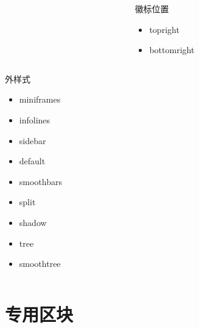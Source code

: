 \documentclass[
    aspectratio=169,  %
]{ctexbeamer}
\begin{document}
\begin{frame}
\begin{columns}[T]
\begin{column}{0.7\textwidth}
\begin{columns}[t]
\begin{column}{0.25\textwidth}
        \end{column}
        \begin{column}{0.3\textwidth}
          \begin{alertblock}{徽标位置}
            \ttfamily
            \begin{itemize}
              \item topright
              \item bottomright
            \end{itemize}
          \end{alertblock}
        \end{column}
      \end{columns}
      \begin{alertblock}{外样式}
        \ttfamily
        \begin{multicols}{3}
          \begin{itemize}
            \item miniframes
            \item infolines
            \item sidebar
            \item default
            \item smoothbars
            \item split
            \item shadow
            \item tree
            \item smoothtree
          \end{itemize}
        \end{multicols}
      \end{alertblock}
    \end{column}
  \end{columns}
\end{frame}

\section{专用区块}
\end{document}
